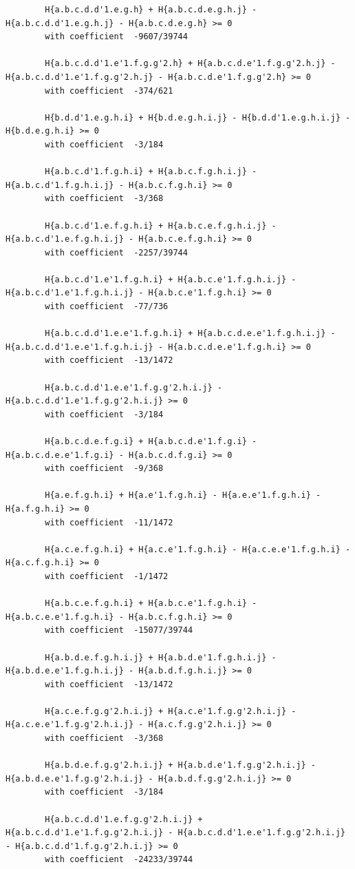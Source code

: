 \documentclass[11pt, a4paper]{kybernetika}
\begin{document}
\begin{verbatim}
		H{a.b.c.d.d'1.e.g.h} + H{a.b.c.d.e.g.h.j} - H{a.b.c.d.d'1.e.g.h.j} - H{a.b.c.d.e.g.h} >= 0
		with coefficient  -9607/39744
		
		H{a.b.c.d.d'1.e'1.f.g.g'2.h} + H{a.b.c.d.e'1.f.g.g'2.h.j} - H{a.b.c.d.d'1.e'1.f.g.g'2.h.j} - H{a.b.c.d.e'1.f.g.g'2.h} >= 0
		with coefficient  -374/621
		
		H{b.d.d'1.e.g.h.i} + H{b.d.e.g.h.i.j} - H{b.d.d'1.e.g.h.i.j} - H{b.d.e.g.h.i} >= 0
		with coefficient  -3/184
		
		H{a.b.c.d'1.f.g.h.i} + H{a.b.c.f.g.h.i.j} - H{a.b.c.d'1.f.g.h.i.j} - H{a.b.c.f.g.h.i} >= 0
		with coefficient  -3/368
		
		H{a.b.c.d'1.e.f.g.h.i} + H{a.b.c.e.f.g.h.i.j} - H{a.b.c.d'1.e.f.g.h.i.j} - H{a.b.c.e.f.g.h.i} >= 0
		with coefficient  -2257/39744
		
		H{a.b.c.d'1.e'1.f.g.h.i} + H{a.b.c.e'1.f.g.h.i.j} - H{a.b.c.d'1.e'1.f.g.h.i.j} - H{a.b.c.e'1.f.g.h.i} >= 0
		with coefficient  -77/736
		
		H{a.b.c.d.d'1.e.e'1.f.g.h.i} + H{a.b.c.d.e.e'1.f.g.h.i.j} - H{a.b.c.d.d'1.e.e'1.f.g.h.i.j} - H{a.b.c.d.e.e'1.f.g.h.i} >= 0
		with coefficient  -13/1472
		
		H{a.b.c.d.d'1.e.e'1.f.g.g'2.h.i.j} - H{a.b.c.d.d'1.e'1.f.g.g'2.h.i.j} >= 0
		with coefficient  -3/184
		
		H{a.b.c.d.e.f.g.i} + H{a.b.c.d.e'1.f.g.i} - H{a.b.c.d.e.e'1.f.g.i} - H{a.b.c.d.f.g.i} >= 0
		with coefficient  -9/368
		
		H{a.e.f.g.h.i} + H{a.e'1.f.g.h.i} - H{a.e.e'1.f.g.h.i} - H{a.f.g.h.i} >= 0
		with coefficient  -11/1472
		
		H{a.c.e.f.g.h.i} + H{a.c.e'1.f.g.h.i} - H{a.c.e.e'1.f.g.h.i} - H{a.c.f.g.h.i} >= 0
		with coefficient  -1/1472
		
		H{a.b.c.e.f.g.h.i} + H{a.b.c.e'1.f.g.h.i} - H{a.b.c.e.e'1.f.g.h.i} - H{a.b.c.f.g.h.i} >= 0
		with coefficient  -15077/39744
		
		H{a.b.d.e.f.g.h.i.j} + H{a.b.d.e'1.f.g.h.i.j} - H{a.b.d.e.e'1.f.g.h.i.j} - H{a.b.d.f.g.h.i.j} >= 0
		with coefficient  -13/1472
		
		H{a.c.e.f.g.g'2.h.i.j} + H{a.c.e'1.f.g.g'2.h.i.j} - H{a.c.e.e'1.f.g.g'2.h.i.j} - H{a.c.f.g.g'2.h.i.j} >= 0
		with coefficient  -3/368
		
		H{a.b.d.e.f.g.g'2.h.i.j} + H{a.b.d.e'1.f.g.g'2.h.i.j} - H{a.b.d.e.e'1.f.g.g'2.h.i.j} - H{a.b.d.f.g.g'2.h.i.j} >= 0
		with coefficient  -3/184
		
		H{a.b.c.d.d'1.e.f.g.g'2.h.i.j} + H{a.b.c.d.d'1.e'1.f.g.g'2.h.i.j} - H{a.b.c.d.d'1.e.e'1.f.g.g'2.h.i.j} - H{a.b.c.d.d'1.f.g.g'2.h.i.j} >= 0
		with coefficient  -24233/39744
		

\end{verbatim}
\end{document}
